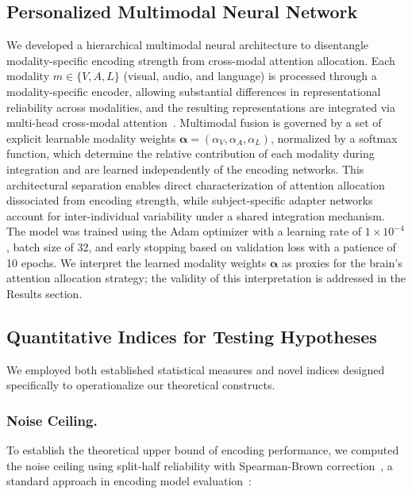 \documentclass[10pt,letterpaper]{article}
\begin{document}
\subsection{Personalized Multimodal Neural Network}

We developed a hierarchical multimodal neural architecture to disentangle modality-specific encoding strength from cross-modal attention allocation. Each modality $m \in \{V, A, L\}$ (visual, audio, and language) is processed through a modality-specific encoder, allowing substantial differences in representational reliability across modalities, and the resulting representations are integrated via multi-head cross-modal attention~\citep{vaswani2017attention}. Multimodal fusion is governed by a set of explicit learnable modality weights $\boldsymbol{\alpha} = (\alpha_V, \alpha_A, \alpha_L)$, normalized by a softmax function, which determine the relative contribution of each modality during integration and are learned independently of the encoding networks. This architectural separation enables direct characterization of attention allocation dissociated from encoding strength, while subject-specific adapter networks account for inter-individual variability under a shared integration mechanism. The model was trained using the Adam optimizer with a learning rate of $1 \times 10^{-4}$, batch size of 32, and early stopping based on validation loss with a patience of 10 epochs. We interpret the learned modality weights $\boldsymbol{\alpha}$ as proxies for the brain's attention allocation strategy; the validity of this interpretation is addressed in the Results section.

\subsection{Quantitative Indices for Testing Hypotheses}

We employed both established statistical measures and novel indices designed specifically to operationalize our theoretical constructs.

\subsubsection{Noise Ceiling.}

To establish the theoretical upper bound of encoding performance, we computed the noise ceiling using split-half reliability with Spearman-Brown correction~\citep{spearman1910correlation}, a standard approach in encoding model evaluation~\citep{schoppe2016measuring}:
\end{document}
